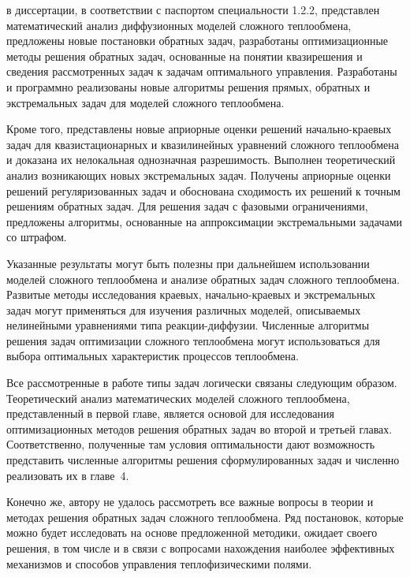 в диссертации, в соответствии с паспортом специальности 1.2.2, представлен
математический анализ диффузионных моделей сложного теплообмена,
предложены новые постановки обратных задач, разработаны
оптимизационные методы решения обратных задач, основанные на понятии
квазирешения и сведения рассмотренных задач к задачам оптимального
управления.
Разработаны и программно реализованы новые алгоритмы
решения прямых, обратных и экстремальных задач для моделей сложного
теплообмена.


Кроме того, представлены новые априорные оценки решений начально-краевых задач для
квазистационарных и квазилинейных уравнений сложного теплообмена и
доказана их нелокальная однозначная разрешимость.
Выполнен теоретический анализ возникающих новых экстремальных задач.
Получены априорные оценки решений регуляризованных задач и
обоснована сходимость их решений к точным решениям обратных задач.
Для решения задач с фазовыми ограничениями, предложены алгоритмы,
основанные на аппроксимации экстремальными задачами со штрафом.


Указанные результаты могут быть полезны при дальнейшем использовании
моделей сложного теплообмена и анализе обратных задач сложного
теплообмена.
Развитые методы исследования краевых, начально-краевых и
экстремальных задач могут применяться для изучения различных моделей,
описываемых нелинейными уравнениями типа реакции-диффузии.
Численные алгоритмы решения задач оптимизации сложного теплообмена
могут использоваться для выбора оптимальных характеристик процессов
теплообмена.


Все рассмотренные в работе типы задач логически связаны следующим образом.
Теоретический анализ математических моделей сложного
теплообмена, представленный в первой главе, является основой для
исследования оптимизационных методов решения обратных задач во второй
и третьей главах.
Соответственно, полученные там условия оптимальности
дают возможность представить численные алгоритмы решения
сформулированных задач и численно реализовать их в главе~4.


Конечно же, автору не удалось рассмотреть все важные вопросы в теории и
методах решения обратных задач сложного теплообмена.
Ряд постановок, которые можно будет исследовать на основе
предложенной методики, ожидает своего решения, в том числе и в связи с
вопросами нахождения наиболее эффективных механизмов и способов
управления теплофизическими полями.
